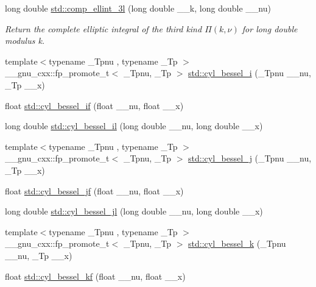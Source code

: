 \begin{DoxyCompactItemize}
long double \hyperlink{group__mathsf__std_ga1ca081fee102cd0d4d6b091285e495e5}{std\+::comp\+\_\+ellint\+\_\+3l} (long double \+\_\+\+\_\+k, long double \+\_\+\+\_\+nu)
\begin{DoxyCompactList}\small\item\em Return the complete elliptic integral of the third kind $ \Pi(k,\nu) $ for {\ttfamily long double} modulus {\ttfamily k}. \end{DoxyCompactList}\item 
{\footnotesize template$<$typename \+\_\+\+Tpnu , typename \+\_\+\+Tp $>$ }\\\+\_\+\+\_\+gnu\+\_\+cxx\+::fp\+\_\+promote\+\_\+t$<$ \+\_\+\+Tpnu, \+\_\+\+Tp $>$ \hyperlink{group__mathsf__std_ga29504b6008798072b0b8d6ea5a50ec60}{std\+::cyl\+\_\+bessel\+\_\+i} (\+\_\+\+Tpnu \+\_\+\+\_\+nu, \+\_\+\+Tp \+\_\+\+\_\+x)
\item 
float \hyperlink{group__mathsf__std_gaaf738427d4da0bda66bc2274dfb853a7}{std\+::cyl\+\_\+bessel\+\_\+if} (float \+\_\+\+\_\+nu, float \+\_\+\+\_\+x)
\item 
long double \hyperlink{group__mathsf__std_gab7962629216d03efb8ecaa3f70c6878f}{std\+::cyl\+\_\+bessel\+\_\+il} (long double \+\_\+\+\_\+nu, long double \+\_\+\+\_\+x)
\item 
{\footnotesize template$<$typename \+\_\+\+Tpnu , typename \+\_\+\+Tp $>$ }\\\+\_\+\+\_\+gnu\+\_\+cxx\+::fp\+\_\+promote\+\_\+t$<$ \+\_\+\+Tpnu, \+\_\+\+Tp $>$ \hyperlink{group__mathsf__std_ga644f7eb975809674db88768f2f115744}{std\+::cyl\+\_\+bessel\+\_\+j} (\+\_\+\+Tpnu \+\_\+\+\_\+nu, \+\_\+\+Tp \+\_\+\+\_\+x)
\item 
float \hyperlink{group__mathsf__std_ga15731a7bccd6351d28353e3c4c2a2d23}{std\+::cyl\+\_\+bessel\+\_\+jf} (float \+\_\+\+\_\+nu, float \+\_\+\+\_\+x)
\item 
long double \hyperlink{group__mathsf__std_gade8e94a80520a8b628b2d658755b25c0}{std\+::cyl\+\_\+bessel\+\_\+jl} (long double \+\_\+\+\_\+nu, long double \+\_\+\+\_\+x)
\item 
{\footnotesize template$<$typename \+\_\+\+Tpnu , typename \+\_\+\+Tp $>$ }\\\+\_\+\+\_\+gnu\+\_\+cxx\+::fp\+\_\+promote\+\_\+t$<$ \+\_\+\+Tpnu, \+\_\+\+Tp $>$ \hyperlink{group__mathsf__std_gac73d664b8e7ceba7f8e786c93e97a084}{std\+::cyl\+\_\+bessel\+\_\+k} (\+\_\+\+Tpnu \+\_\+\+\_\+nu, \+\_\+\+Tp \+\_\+\+\_\+x)
\item 
float \hyperlink{group__mathsf__std_ga1f50047f9aab0ec8b1a1615fe9fbe32f}{std\+::cyl\+\_\+bessel\+\_\+kf} (float \+\_\+\+\_\+nu, float \+\_\+\+\_\+x)

\end{DoxyCompactItemize}
